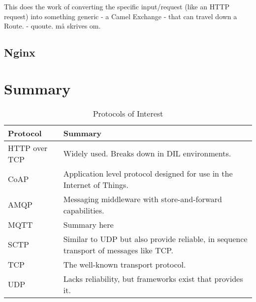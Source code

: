 This does the work of converting the specific input/request (like an HTTP
request) into something generic - a Camel Exchange - that can travel down a
Route.
 - quoute. må skrives om.

\subsection{Nginx}


\section{Summary}


\begin{table}[h]
\begin{tabularx}{\textwidth}{| X | X |}
\hline
  \textbf{Protocol} & \textbf{Summary} \\ \hline
  HTTP over TCP & Widely used. Breaks down in DIL environments.\\ \hline
  CoAP & Application level protocol designed for use in the Internet of Things. \\ \hline
  AMQP & Messaging middleware with store-and-forward capabilities.\\ \hline
  MQTT & Summary here\\ \hline
  SCTP & Similar to UDP but also provide reliable, in sequence transport of messages like TCP. \\ \hline
  TCP & The well-known transport protocol. \\ \hline
  UDP & Lacks reliability, but frameworks exist that provides it. \\ \hline
\end{tabularx}
\caption{Protocols of Interest}
\end{table}
